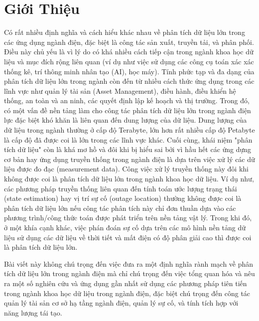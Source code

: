 \documentclass[utf8]{frontiersSCNS} %
\begin{document}
\section{Giới Thiệu}

Có rất nhiều định nghĩa và cách hiểu khác nhau về phân tích dữ liệu lớn trong các ứng dụng ngành điện, đặc biệt là công tác sản xuất, truyền tải, và phân phối. Điều này chủ yếu là vì lý do có khá nhiều cách tiếp cận trong ngành khoa học dữ liệu và mục đích rộng liên quan (ví dụ như việc sử dụng các công cụ toán xác xác thống kê, trí thông minh nhân tạo (AI), học máy). Tính phức tạp và đa dạng của phân tích dữ liệu lớn trong ngành còn đến từ nhiều cách thức ứng dụng trong các lĩnh vực như quản lý tài sản (Asset Management), điều hành, điều khiển hệ thống, an toàn và an ninh, các quyết định lập kế hoạch và thị trường. Trong đó, có một vấn đề nền tảng làm cho công tác phân tích dữ liệu lớn trong ngành điện lực đặc biệt khó khăn là liên quan đến dung lượng của dữ liệu. Dung lượng của dữ liệu trong ngành thường ở cấp độ Terabyte, lớn hơn rất nhiều cấp độ Petabyte là cấp độ đã được coi là lớn trong các lĩnh vực khác. Cuối cùng, khái niệm "phân tích dữ liệu" còn là khá mơ hồ và đôi khi bị hiểu sai bởi vì hầu hết các ứng dựng cơ bản hay ứng dụng truyền thống trong ngành điện là dựa trên việc xử lý các dữ liệu được đo đạc (measurement data). Công việc xử lý truyền thống này đôi khi không được coi là phân tích dữ liệu lớn trong ngành khoa học dữ liệu. Ví dụ như, các phương pháp truyền thống liên quan đến tính toán ước lượng trạng thái (state estimation) hay vị trí sự cố (outage location) thường không được coi là phân tích dữ liệu lớn nếu công tác phân tích này chỉ đơn thuần dựa vào các phương trình/công thức toán được phát triển trên nền tảng vật lý. Trong khi đó, ở một khía cạnh khác, việc phán đoán sự cố dựa trên các mô hình nền tảng dữ liệu sử dụng các dữ liệu về thời tiết và mất điện có độ phân giải cao thì được coi là phân tích dữ liệu lớn.

Bài viết này không chú trọng đến việc đưa ra một định nghĩa rành mạch về phân tích dữ liệu lớn trong ngành điện mà chỉ chú trọng đến việc tổng quan hóa và nêu ra một số nghiên cứu và ứng dụng gần nhất sử dụng các phương pháp tiên tiến trong ngành khoa học dữ liệu trong ngành điện, đặc biệt chú trọng đến công tác quản lý tài sản cơ sở hạ tầng ngành điện, quản lý sự cố, và tính tích hợp với năng lượng tái tạo.
\end{document}
